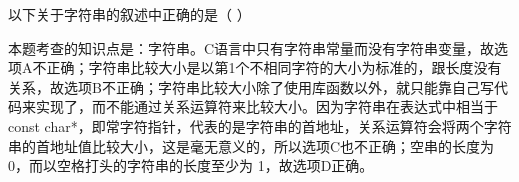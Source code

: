\question 以下关于字符串的叙述中正确的是（ ）
\par{}
\begin{solution}本题考查的知识点是：字符串。C语言中只有字符串常量而没有字符串变量，故选项A不正确；字符串比较大小是以第1个不相同字符的大小为标准的，跟长度没有关系，故选项B不正确；字符串比较大小除了使用库函数以外，就只能靠自己写代码来实现了，而不能通过关系运算符来比较大小。因为字符串在表达式中相当于const
char*，即常字符指针，代表的是字符串的首地址，关系运算符会将两个字符串的首地址值比较大小，这是毫无意义的，所以选项C也不正确；空串的长度为0，而以空格打头的字符串的长度至少为
1，故选项D正确。
\end{solution}
